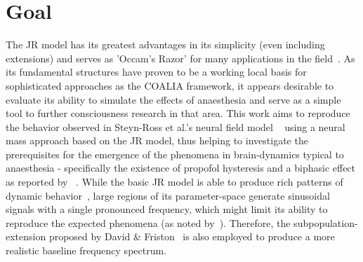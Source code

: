 \section{Goal}\label{sec:goal}
The JR model has its greatest advantages in its simplicity (even including extensions) and serves as 'Occam's Razor'
for many applications in the field~\cite{kuhlmann_neural_2016}.
As its fundamental structures have proven to be a working local basis for sophisticated approaches as the COALIA
framework,
it appears desirable to evaluate its ability to simulate the effects of anaesthesia and serve as a simple tool to
further consciousness research in that area.
This work aims to reproduce the behavior observed in Steyn-Ross et al.'s neural field model ~\cite{hutt_progress_2011}
using a neural mass approach based on the JR model,
thus helping to investigate the prerequisites for the emergence of the phenomena in brain-dynamics typical to
anaesthesia - specifically the existence of propofol hysteresis and a biphasic effect as reported by
~\cite{hutt_progress_2011}.
While the basic JR model is able to produce rich patterns of dynamic behavior~\cite{spiegler_bifurcation_2010},
large regions of its parameter-space generate sinusoidal signals with a single pronounced frequency,
which might limit its ability to reproduce the expected phenomena (as noted by~\cite{kuhlmann_neural_2016}).
Therefore, the subpopulation-extension proposed by David \& Friston~\cite{david_neural_2003} is also employed to
produce a more realistic baseline frequency spectrum.














%

%
%


